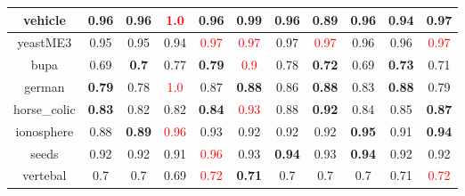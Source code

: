 \documentclass{article}%
\begin{document}
\begin{tabular}{c|cccccccccc}
\hline%
vehicle&0.96&0.96&\textcolor{red}{ 
1.0
}&0.96&\textbf{0.99}&0.96&0.89&\textbf{0.96}&0.94&\textbf{0.97}\\%
\hline%
yeastME3&0.95&0.95&0.94&\textcolor{red}{ 
0.97
}&\textcolor{red}{ 
0.97
}&0.97&\textcolor{red}{ 
0.97
}&0.96&0.96&\textcolor{red}{ 
0.97
}\\%
\hline%
bupa&0.69&\textbf{0.7}&0.77&\textbf{0.79}&\textcolor{red}{ 
0.9
}&0.78&\textbf{0.72}&0.69&\textbf{0.73}&0.71\\%
\hline%
german&\textbf{0.79}&0.78&\textcolor{red}{ 
1.0
}&0.87&\textbf{0.88}&0.86&\textbf{0.88}&0.83&\textbf{0.88}&0.79\\%
\hline%
horse\_colic&\textbf{0.83}&0.82&0.82&\textbf{0.84}&\textcolor{red}{ 
0.93
}&0.88&\textbf{0.92}&0.84&0.85&\textbf{0.87}\\%
\hline%
ionosphere&0.88&\textbf{0.89}&\textcolor{red}{ 
0.96
}&0.93&0.92&0.92&0.92&\textbf{0.95}&0.91&\textbf{0.94}\\%
\hline%
seeds&0.92&0.92&0.91&\textcolor{red}{ 
0.96
}&0.93&\textbf{0.94}&0.93&\textbf{0.94}&0.92&0.92\\%
\hline%
vertebal&0.7&0.7&0.69&\textcolor{red}{ 
0.72
}&\textbf{0.71}&0.7&0.7&0.7&0.71&\textcolor{red}{ 
0.72
}\\%
\hline%
\end{tabular}

%
\end{document}
